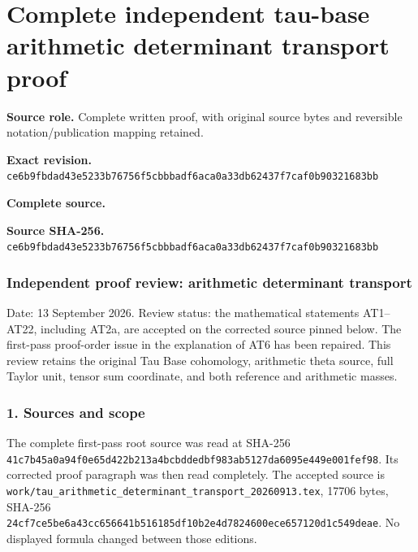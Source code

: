 \begingroup

\section{Complete independent tau-base arithmetic determinant transport proof}


\begingroup
\sloppy
\small

\noindent\textbf{Source role.} Complete written proof, with original source bytes and reversible notation/publication mapping retained.\par
\noindent\textbf{Exact revision.} \nolinkurl{ce6b9fbdad43e5233b76756f5cbbbadf6aca0a33db62437f7caf0b90321683bb}\par
\noindent\textbf{Complete source.} \par
\noindent\textbf{Source SHA-256.} \nolinkurl{ce6b9fbdad43e5233b76756f5cbbbadf6aca0a33db62437f7caf0b90321683bb}\par\medskip
\subsubsection{Independent proof review: arithmetic determinant transport}\label{endpoint-determinant_review--independent-proof-review-arithmetic-determinant-transport}

Date: 13 September 2026. Review status: the mathematical statements AT1--AT22, including AT2a, are accepted on the corrected source pinned below. The first-pass proof-order issue in the explanation of AT6 has been repaired. This review retains the original Tau Base cohomology, arithmetic theta source, full Taylor unit, tensor sum coordinate, and both reference and arithmetic masses.

\subsubsection{1. Sources and scope}\label{endpoint-determinant_review--sources-and-scope}

The complete first-pass root source was read at SHA-256 \nolinkurl{41c7b45a0a94f0e65d422b213a4bcbddedbf983ab5127da6095e449e001fef98}. Its corrected proof paragraph was then read completely. The accepted source is \nolinkurl{work/tau_arithmetic_determinant_transport_20260913.tex}, 17706 bytes, SHA-256 \nolinkurl{24cf7ce5be6a43cc656641b516185df10b2e4d7824600ece657120d1c549deae}. No displayed formula changed between those editions.

